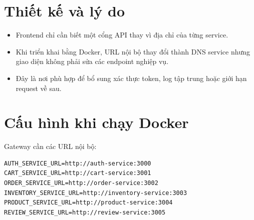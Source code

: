 \documentclass[12pt]{article}
\begin{document}
\section{Thiết kế và lý do}
\begin{itemize}
  \item Frontend chỉ cần biết một cổng API thay vì địa chỉ của từng service.
  \item Khi triển khai bằng Docker, URL nội bộ thay đổi thành DNS service nhưng giao diện không phải sửa các endpoint nghiệp vụ.
  \item Đây là nơi phù hợp để bổ sung xác thực token, log tập trung hoặc giới hạn request về sau.
\end{itemize}

\section{Cấu hình khi chạy Docker}
Gateway cần các URL nội bộ:
\begin{verbatim}
AUTH_SERVICE_URL=http://auth-service:3000
CART_SERVICE_URL=http://cart-service:3001
ORDER_SERVICE_URL=http://order-service:3002
INVENTORY_SERVICE_URL=http://inventory-service:3003
PRODUCT_SERVICE_URL=http://product-service:3004
REVIEW_SERVICE_URL=http://review-service:3005
\end{verbatim}

\end{document}
